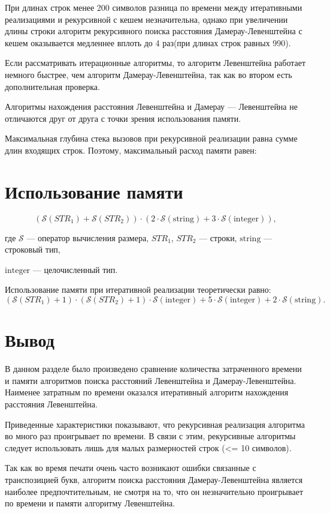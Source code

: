 При длинах строк менее 200 символов разница по времени между 
итеративными реализациями и рекурсивной с кешем незначительна, 
однако при увеличении 
длины строки алгоритм рекурсивного поиска расстояния Дамерау-Левенштейна с кешем 
оказывается медленнее вплоть до 4 раз(при длинах строк равных 990). 

Если рассматривать итерационные алгоритмы, то алгоритм Левенштейна работает немного быстрее,
чем алгоритм Дамерау-Левенштейна, так как во втором есть дополнительная проверка.

Алгоритмы нахождения расстояния Левенштейна и Дамерау — Левенштейна не отличаются друг от друга с точки зрения использования памяти.

Максимальная глубина стека вызовов при рекурсивной реализации равна сумме длин входящих строк. Поэтому, максимальный расход памяти равен: 

\clearpage

\section{Использование памяти}

\begin{equation}
(\mathcal{S}(STR_1) + \mathcal{S}(STR_2)) \cdot (2 \cdot \mathcal{S}\mathrm{(string)} + 3 \cdot \mathcal{S}\mathrm{(integer)}),
\end{equation}

\noindent где $\mathcal{S}$ — оператор вычисления размера, $STR_1$, $STR_2$ — строки, $\mathrm{string}$ — строковый тип, 

\noindent $\mathrm{integer}$ — целочисленный тип.

Использование памяти при итеративной реализации теоретически равно:
\begin{equation}
(\mathcal{S}(STR_1) + 1) \cdot (\mathcal{S}(STR_2) + 1) \cdot \mathcal{S}\mathrm{(integer)} + 5\cdot \mathcal{S}\mathrm{(integer)} + 2 \cdot \mathcal{S}\mathrm{(string)}.
\end{equation}

\section{Вывод}

В данном разделе было произведено сравнение количества затраченного времени 
и памяти алгоритмов поиска расстояний Левенштейна и Дамерау-Левенштейна. 
Наименее затратным по времени оказался итеративный алгоритм нахождения расстояния 
Левенштейна.

Приведенные характеристики показывают, что рекурсивная реализация алгоритма 
во много раз проигрывает по времени. В связи с этим, рекурсивные алгоритмы следует 
использовать лишь для малых размерностей строк (<= 10 символов).

Так как во время печати очень часто возникают ошибки связанные с 
транспозицией букв, алгоритм поиска расстояния Дамерау-Левенштейна 
является наиболее предпочтительным, не смотря на то, что он незначительно 
проигрывает по времени и памяти алгоритму Левенштейна.

